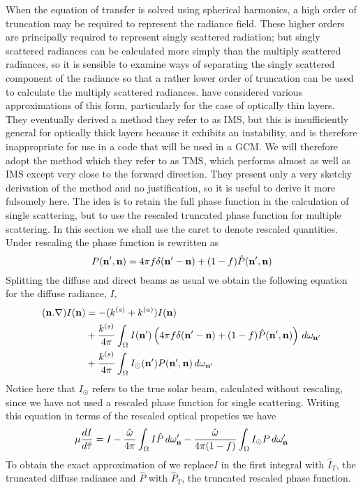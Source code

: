 When the equation of transfer is solved using spherical harmonics, a high
order of truncation may be required to represent the radiance field. These
higher orders are principally required to represent singly scattered
radiation; but singly scattered radiances can be calculated more simply
than the multiply scattered radiances, so it is sensible to examine ways
of separating the singly scattered component of the radiance so that a
rather lower order of truncation can be used to calculate the multiply 
scattered radiances. \cite{Nakajima88} have considered various approximations
of this form, particularly for the case of optically thin layers. They
eventually derived a method they refer to as IMS, but this 
is insufficiently general
for optically thick layers because it exhibits an instability, and is
therefore inappropriate for use in a code that will be used in a GCM.
We will therefore adopt the method which they refer to as TMS, which performs
almost as well as IMS except very close to the forward direction. They present 
only a very sketchy derivation of the method and no justification, 
so it is useful to derive it more fulsomely here.
The idea is to retain the full phase function in the calculation of single
scattering, but to use the rescaled truncated phase function for multiple
scattering. In this section we shall use the caret to denote rescaled 
quantities. Under rescaling the phase function is rewritten as
\begin{equation}
P(\mathbf{n}', \mathbf{n}) = 4 \pi f \delta(\mathbf{n}'-\mathbf{n}) + (1-f) \hat P (\mathbf{n}', \mathbf{n})
\end{equation}
Splitting the diffuse and direct beams as usual we obtain the following
equation for the diffuse radiance, $I$,
\begin{equation}
\begin{split}
(\mathbf{n} . \nabla) I(\mathbf{n}) & = -(k^{(s)} + k^{(a)}) I (\mathbf{n}) \\
& + { k^{(s)} \over
{4 \pi} } \int_{\Omega} I(\mathbf{n}') \left ( 4 \pi f \delta(\mathbf{n}'-\mathbf{n}) 
+ (1-f) \hat P(\mathbf{n}', \mathbf{n}) \right ) \, d\omega_{\mathbf{n}'} \\
& + { k^{(s)} \over
{4 \pi} } \int_{\Omega} I_\odot(\mathbf{n}') P(\mathbf{n}', \mathbf{n}) \, d\omega_{\mathbf{n}'}
\end{split}
\end{equation}
Notice here that $I_\odot$ refers to the true solar beam, calculated without
rescaling, since we have not used a rescaled phase function for single 
scattering. Writing this equation in terms of the rescaled optical propeties
we have
\begin{equation}
\mu {{dI}\over{d\hat\tau}} = I -{\hat\omega\over{4\pi}} \int_\Omega I \hat P
\, d\omega_\mathbf{n}' - {\hat\omega\over{4\pi (1-f)}} \int_\Omega I_\odot P
\, d\omega_\mathbf{n}'
\end{equation}
To obtain the exact approximation of \cite{Nakajima88} we replace$I$ in
the first integral with $\hat I_T$, the truncated diffuse radiance and
$\hat P$ with $\hat P_T$, the truncated rescaled phase function.

